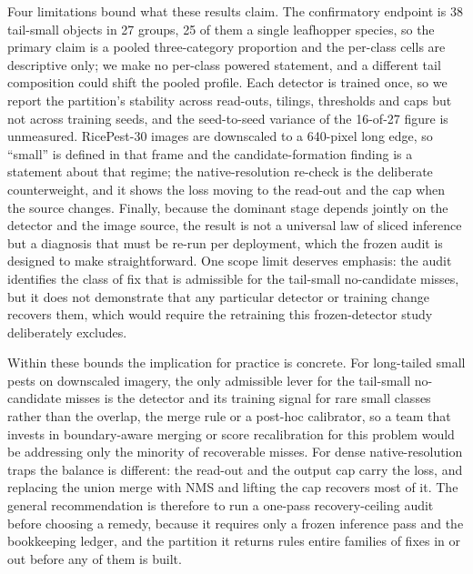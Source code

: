 Four limitations bound what these results claim. The confirmatory endpoint is 38 tail-small objects in 27 groups, 25 of them a single leafhopper species, so the primary claim is a pooled three-category proportion and the per-class cells are descriptive only; we make no per-class powered statement, and a different tail composition could shift the pooled profile. Each detector is trained once, so we report the partition's stability across read-outs, tilings, thresholds and caps but not across training seeds, and the seed-to-seed variance of the 16-of-27 figure is unmeasured. RicePest-30 images are downscaled to a 640-pixel long edge, so ``small'' is defined in that frame and the candidate-formation finding is a statement about that regime; the native-resolution re-check is the deliberate counterweight, and it shows the loss moving to the read-out and the cap when the source changes. Finally, because the dominant stage depends jointly on the detector and the image source, the result is not a universal law of sliced inference but a diagnosis that must be re-run per deployment, which the frozen audit is designed to make straightforward. One scope limit deserves emphasis: the audit identifies the class of fix that is admissible for the tail-small no-candidate misses, but it does not demonstrate that any particular detector or training change recovers them, which would require the retraining this frozen-detector study deliberately excludes.

Within these bounds the implication for practice is concrete. For long-tailed small pests on downscaled imagery, the only admissible lever for the tail-small no-candidate misses is the detector and its training signal for rare small classes rather than the overlap, the merge rule or a post-hoc calibrator, so a team that invests in boundary-aware merging or score recalibration for this problem would be addressing only the minority of recoverable misses. For dense native-resolution traps the balance is different: the read-out and the output cap carry the loss, and replacing the union merge with NMS and lifting the cap recovers most of it. The general recommendation is therefore to run a one-pass recovery-ceiling audit before choosing a remedy, because it requires only a frozen inference pass and the bookkeeping ledger, and the partition it returns rules entire families of fixes in or out before any of them is built.

